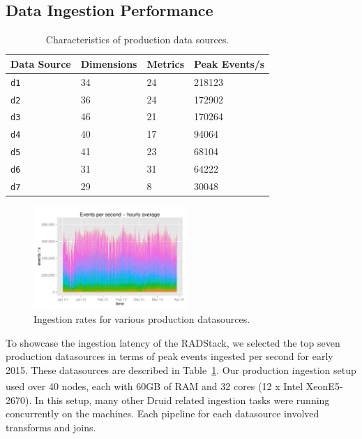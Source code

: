 \documentclass{vldb}
\begin{document}
\subsection{Data Ingestion Performance}
\begin{table}
  \centering
  \scriptsize\begin{tabular}{| l | l | l | l |}
    \hline
    \textbf{Data Source} & \textbf{Dimensions} & \textbf{Metrics} & \textbf{Peak Events/s} \\ \hline
    \texttt{d1} & 34 & 24 & 218123 \\ \hline
    \texttt{d2} & 36 & 24 & 172902 \\ \hline
    \texttt{d3} & 46 & 21 & 170264 \\ \hline
    \texttt{d4} & 40 & 17 & 94064 \\ \hline
    \texttt{d5} & 41 & 23 & 68104 \\ \hline
    \texttt{d6} & 31 & 31 & 64222 \\ \hline
    \texttt{d7} & 29 & 8 & 30048 \\ \hline
  \end{tabular}
  \normalsize
  \caption{Characteristics of production data sources.}
  \label{tab:ingestion}
\end{table}

\begin{figure}
\centering
\includegraphics[width = 2.3in]{radstack-event-throughput}
\caption{Ingestion rates for various production datasources.}
\label{fig:ingestion_rates}
\end{figure}

To showcase the ingestion latency of the RADStack, we selected the top seven
production datasources in terms of peak events ingested per second for early
2015. These datasources are described in Table~\ref{tab:ingestion}. Our
production ingestion setup used over 40 nodes, each with 60GB of RAM and 32
cores (12 x Intel\textsuperscript\textregistered
Xeon\textsuperscript\textregistered E5-2670). In this setup, many other Druid
related ingestion tasks were running concurrently on the machines. Each
pipeline for each datasource involved transforms and joins.
\end{document}
